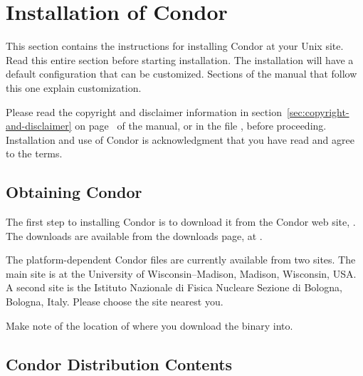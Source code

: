 \section{\label{sec:install}Installation of Condor}

This section contains the instructions for installing Condor at your
Unix site.
Read this entire section before starting installation.
The installation will have a default configuration that can
be customized.
Sections of the manual that follow this one explain customization.

Please read the copyright and disclaimer information in 
section~\ref{sec:copyright-and-disclaimer} on
page~\pageref{sec:copyright-and-disclaimer} of the manual, or in the
file , before proceeding.  Installation and
use of Condor is acknowledgment that you have read and agree to the
terms.

\subsection{\label{sec:pre-install-procedure}
Obtaining Condor}
The first step to installing Condor is to download it from the Condor
web site, .
The downloads are available from the downloads page,
at .

The platform-dependent Condor files are currently available from two sites.
The main site is at the University of Wisconsin--Madison,
Madison, Wisconsin, USA.
A second site is the Istituto Nazionale di Fisica Nucleare Sezione di
Bologna, Bologna, Italy.
Please choose the site nearest you.

Make note of the location of where you download the binary into.

\subsection{\label{sec:install-contents}
Condor Distribution Contents}

